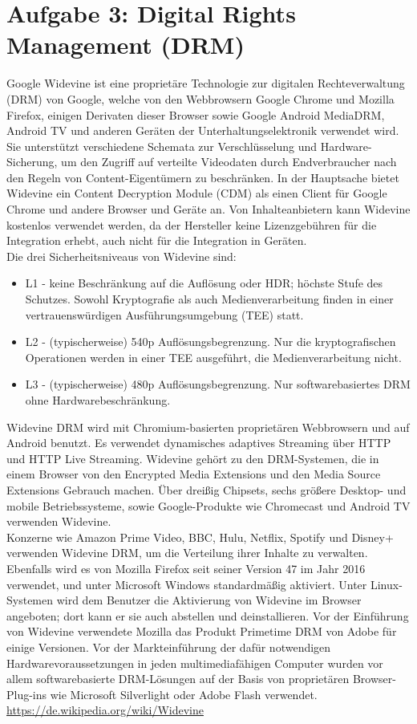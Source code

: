 \documentclass{article}
\begin{document}
	\section*{Aufgabe 3: Digital Rights Management (DRM)}
	Google Widevine ist eine proprietäre Technologie zur digitalen Rechteverwaltung (DRM) von Google, welche von den Webbrowsern Google Chrome und Mozilla Firefox, einigen Derivaten dieser Browser sowie Google Android MediaDRM, Android TV und anderen Geräten der Unterhaltungselektronik verwendet wird. Sie unterstützt verschiedene Schemata zur Verschlüsselung und Hardware-Sicherung, um den Zugriff auf verteilte Videodaten durch Endverbraucher nach den Regeln von Content-Eigentümern zu beschränken. In der Hauptsache bietet Widevine ein Content Decryption Module (CDM) als einen Client für Google Chrome und andere Browser und Geräte an. Von Inhalteanbietern kann Widevine kostenlos verwendet werden, da der Hersteller keine Lizenzgebühren für die Integration erhebt, auch nicht für die Integration in Geräten. \\
	Die drei Sicherheitsniveaus von Widevine sind:
	\begin{itemize}
		\item L1 - keine Beschränkung auf die Auflösung oder HDR; höchste Stufe des Schutzes. Sowohl Kryptografie als auch Medienverarbeitung finden in einer vertrauenswürdigen Ausführungsumgebung (TEE) statt.
		\item L2 - (typischerweise) 540p Auflösungsbegrenzung. Nur die kryptografischen Operationen werden in einer TEE ausgeführt, die Medienverarbeitung nicht.
		\item L3 - (typischerweise) 480p Auflösungsbegrenzung. Nur softwarebasiertes DRM ohne Hardwarebeschränkung.
	\end{itemize}
	Widevine DRM wird mit Chromium-basierten proprietären Webbrowsern und auf Android benutzt. Es verwendet dynamisches adaptives Streaming über HTTP und HTTP Live Streaming. Widevine gehört zu den DRM-Systemen, die in einem Browser von den Encrypted Media Extensions und den Media Source Extensions Gebrauch machen. Über dreißig Chipsets, sechs größere Desktop- und mobile Betriebssysteme, sowie Google-Produkte wie Chromecast und Android TV verwenden Widevine. \\
	Konzerne wie Amazon Prime Video, BBC, Hulu, Netflix, Spotify und Disney+ verwenden Widevine DRM, um die Verteilung ihrer Inhalte zu verwalten. \\
	Ebenfalls wird es von Mozilla Firefox seit seiner Version 47 im Jahr 2016 verwendet, und unter Microsoft Windows standardmäßig aktiviert. Unter Linux-Systemen wird dem Benutzer die Aktivierung von Widevine im Browser angeboten; dort kann er sie auch abstellen und deinstallieren. Vor der Einführung von Widevine verwendete Mozilla das Produkt Primetime DRM von Adobe für einige Versionen. Vor der Markteinführung der dafür notwendigen Hardwarevoraussetzungen in jeden multimediafähigen Computer wurden vor allem softwarebasierte DRM-Lösungen auf der Basis von proprietären Browser-Plug-ins wie Microsoft Silverlight oder Adobe Flash verwendet. \\
	\url{https://de.wikipedia.org/wiki/Widevine}
	
\end{document}
